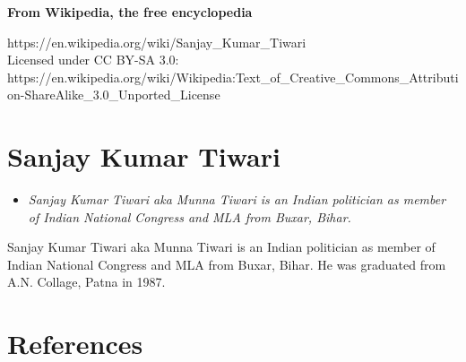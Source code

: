 \textbf{From Wikipedia, the free encyclopedia}

https://en.wikipedia.org/wiki/Sanjay\_Kumar\_Tiwari\\
Licensed under CC BY-SA 3.0:\\
https://en.wikipedia.org/wiki/Wikipedia:Text\_of\_Creative\_Commons\_Attribution-ShareAlike\_3.0\_Unported\_License

\section{Sanjay Kumar Tiwari}\label{sanjay-kumar-tiwari}

\begin{itemize}
\item
  \emph{Sanjay Kumar Tiwari aka Munna Tiwari is an Indian politician as
  member of Indian National Congress and MLA from Buxar, Bihar.}
\end{itemize}

Sanjay Kumar Tiwari aka Munna Tiwari is an Indian politician as member
of Indian National Congress and MLA from Buxar, Bihar. He was graduated
from A.N. Collage, Patna in 1987.

\section{References}\label{references}
